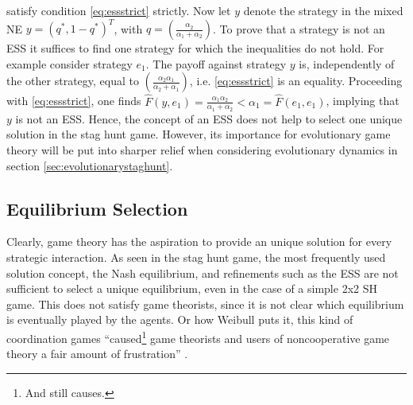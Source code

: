 satisfy condition \eqref{eq:essstrict} strictly. 
Now let $y$ denote the strategy in the mixed NE $y=(q^*,1-q^*)^T$, 
with $q=\left(\frac{\alpha_2}{\alpha_1+\alpha_2}\right)$.
To prove that a strategy is not an ESS it suffices to find one
strategy for which the inequalities do not hold.
For example consider strategy $e_1$.
The payoff against strategy $y$ is, independently of the other strategy, 
equal to $\left(\frac{\alpha_2 \alpha_1}{\alpha_2+\alpha_1}\right)$, i.e. 
\eqref{eq:essstrict} is an equality.
Proceeding with \eqref{eq:essstrict}, one finds
$\hat{F}(y,e_1) = \frac{\alpha_1 \alpha_2}{\alpha_1+\alpha_2}
< \alpha_1 = \hat{F}(e_1,e_1)$, implying that $y$ is not an ESS.
Hence, the concept of an ESS does not help to select one 
unique solution in the stag hunt game. However, its importance for
evolutionary game theory will be put into sharper relief when considering
evolutionary dynamics in section \ref{sec:evolutionarystaghunt}. 


\subsection{Equilibrium Selection}
\label{sec:equilibriumselection}
Clearly, game theory has the aspiration to provide an unique solution for 
every strategic interaction.
As seen in the stag hunt game, the most frequently used solution concept, 
the Nash equilibrium, and refinements such as the ESS are
not sufficient to select a unique equilibrium, even in the case of a simple
2x2 SH game. This does not satisfy game theorists, since it is not clear which
equilibrium is eventually played by the agents. Or how 
Weibull puts it, this kind of coordination games 
``caused\footnote{And still causes.} game theorists and users of 
noncooperative game theory a fair amount of frustration'' 
\parencite[30]{weibull_evolutionary_1997}. 

